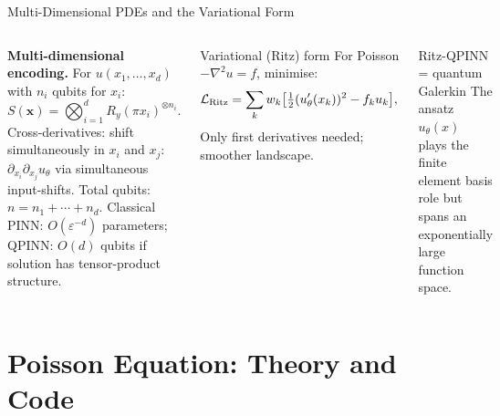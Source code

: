 \documentclass[aspectratio=169,11pt]{beamer}
\newcommand{\bx}{\mathbf{x}}
\begin{document}
\begin{frame}{Multi-Dimensional PDEs and the Variational Form}
  \begin{columns}[T]
    \textbf{Multi-dimensional encoding.}
    For $u(x_1,\ldots,x_d)$ with $n_i$ qubits for $x_i$:
    \[
      S(\bx) = \bigotimes_{i=1}^d R_y(\pi x_i)^{\otimes n_i}.
    \]
    Cross-derivatives: shift simultaneously in $x_i$ and $x_j$:
    $\partial_{x_i}\partial_{x_j}u_\theta$ via simultaneous input-shifts.
    Total qubits: $n = n_1+\cdots+n_d$.
    Classical PINN: $O(\varepsilon^{-d})$ parameters;
    QPINN: $O(d)$ qubits if solution has tensor-product
    structure.

    \begin{block}{Variational (Ritz) form}
      For Poisson $-\nabla^2 u = f$, minimise:
      \[
        \mathcal{L}_{\rm Ritz}
        = \sum_k w_k\bigl[
            \tfrac12(u_\theta'(x_k))^2
            - f_k u_k
          \bigr],
      \]
      Only first derivatives needed; smoother landscape.
    \end{block}
    \begin{alertblock}{Ritz-QPINN = quantum Galerkin}
      The ansatz $u_\theta(x)$ plays the finite element
      basis role but spans an exponentially large function space.
    \end{alertblock}
  \end{columns}
\end{frame}

\section{Poisson Equation: Theory and Code}
\end{document}
